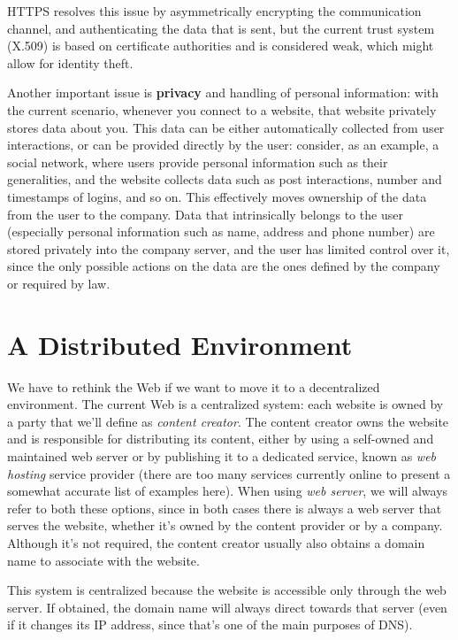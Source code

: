 \documentclass[mscthesis]{usiinfthesis}
\begin{document}
HTTPS resolves this issue by asymmetrically encrypting the communication channel, and authenticating the data that is sent, but the current trust system (X.509) is based on certificate authorities and is considered weak, which might allow for identity theft. %

Another important issue is \textbf{privacy} and handling of personal information: with the current scenario, whenever you connect to a website, that website privately stores data about you.
This data can be either automatically collected from user interactions, or can be provided directly by the user: consider, as an example, a social network, where users provide personal information such as their generalities, and the website collects data such as post interactions, number and timestamps of logins, and so on.
This effectively moves ownership of the data from the user to the company. Data that intrinsically belongs to the user (especially personal information such as name, address and phone number) are stored privately into the company server, and the user has limited control over it, since the only possible actions on the data are the ones defined by the company or required by law.

\section{A Distributed Environment} \label{sec:distributed}
We have to rethink the Web if we want to move it to a decentralized environment. The current Web is a centralized system: each website is owned by a party that we'll define as \textit{content creator}. The content creator owns the website and is responsible for distributing its content, either by using a self-owned and maintained web server or by publishing it to a dedicated service, known as \textit{web hosting} service provider (there are too many services currently online to present a somewhat accurate list of examples here). When using \textit{web server}, we will always refer to both these options, since in both cases there is always a web server that serves the website, whether it's owned by the content provider or by a company.
Although it's not required, the content creator usually also obtains a domain name to associate with the website.

This system is centralized because the website is accessible only through the web server. If obtained, the domain name will always direct towards that server (even if it changes its IP address, since that's one of the main purposes of DNS).
\end{document}
